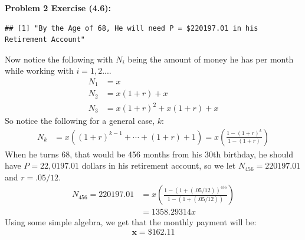 \documentclass[11pt]{article}
\newenvironment{problem}[1]{\textbf{Problem #1: }}{\newpage}
\newenvironment{Shaded}{\begin{snugshade}}{\end{snugshade}}
\newcommand{\CommentTok}[1]{\textcolor[rgb]{0.56,0.35,0.01}{\textit{#1}}}
\newcommand{\ControlFlowTok}[1]{\textcolor[rgb]{0.13,0.29,0.53}{\textbf{#1}}}
\newcommand{\DecValTok}[1]{\textcolor[rgb]{0.00,0.00,0.81}{#1}}
\newcommand{\FloatTok}[1]{\textcolor[rgb]{0.00,0.00,0.81}{#1}}
\newcommand{\KeywordTok}[1]{\textcolor[rgb]{0.13,0.29,0.53}{\textbf{#1}}}
\newcommand{\NormalTok}[1]{#1}
\newcommand{\OperatorTok}[1]{\textcolor[rgb]{0.81,0.36,0.00}{\textbf{#1}}}
\newcommand{\StringTok}[1]{\textcolor[rgb]{0.31,0.60,0.02}{#1}}
\begin{document}
\begin{problem}{2 Exercise (4.6)}
\begin{Shaded}
\end{Shaded}

\begin{verbatim}
## [1] "By the Age of 68, He will need P = $220197.01 in his Retirement Account"
\end{verbatim}

		\newpage
		Now notice the following with $N_i$ being the amount of money he has per month while working with $i = 1,2...$.
		\begin{align*}
			N_1 &= x \\
			N_2 &= x(1+r) + x \\
			N_3 &= x(1+r)^2 + x(1+r) + x
		\end{align*}
		So notice the following for a general case, $k$:
		\begin{align*}
			N_k &= x\left((1+r)^{k-1} + \cdots + (1+r) + 1 \right) = x\left(\frac{1 - (1+r)^{k}}{1 - (1+r)}\right)
		\end{align*}
		When he turns 68, that would be 456 months from his 30th birthday, he should have $P = 22,0197.01$ dollars in his retirement account, so we let $N_{456} = 220197.01$ and $r = .05/12$.
		\begin{align*}
			N_{456} = 220197.01 &= x\left(\frac{1 - (1+(.05/12))^{456}}{1 - (1+(.05/12))}\right) \\
			&= 1358.29314x
		\end{align*} 
		Using some simple algebra, we get that the monthly payment will be:
		\[\boldsymbol{x = \$162.11}\]
	

\end{problem}
\end{document}
